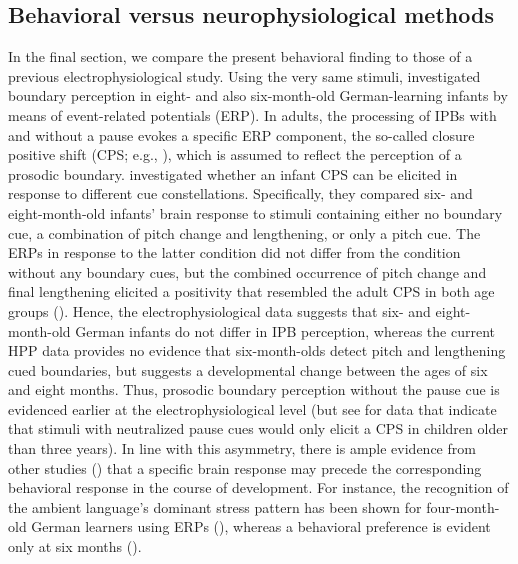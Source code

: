 \documentclass[output=paper]{langscibook}
\begin{document}
\subsection{Behavioral versus neurophysiological methods}
In the final section, we compare the present behavioral finding to those of a previous electrophysiological study. Using the very same stimuli, \citet{Holzgrefe-Lang2018} investigated boundary perception in eight- and also six-month-old German-learning infants by means of event-related potentials (ERP). In adults, the processing of IPBs with and without a pause evokes a specific ERP component, the so-called closure positive shift (CPS; e.g., \citealt{Holzgrefe-Lang2016, Steinhauer1999}), which is assumed to reflect the perception of a prosodic boundary. \citet{Holzgrefe-Lang2018} investigated whether an infant CPS can be elicited in response to different cue constellations. Specifically, they compared six- and eight-month-old infants’ brain response to stimuli containing either no boundary cue, a combination of pitch change and lengthening, or only a pitch cue. The ERPs in response to the latter condition did not differ from the condition without any boundary cues, but the combined occurrence of pitch change and final lengthening elicited a positivity that resembled the adult CPS in both age groups (\citealt{Holzgrefe-Lang2016}). Hence, the electrophysiological data suggests that six- and eight-month-old German infants do not differ in IPB perception, whereas the current HPP data provides no evidence that six-month-olds detect pitch and lengthening cued boundaries, but suggests a developmental change between the ages of six and eight months. Thus, prosodic boundary perception without the pause cue is evidenced earlier at the electrophysiological level (but see \citealt{Mannel2009, Mannel2013} for data that indicate that stimuli with neutralized pause cues would only elicit a CPS in children older than three years). In line with this asymmetry, there is ample evidence from other studies (\citealt{Friederici2007, Hohle2009, Schipke2012}) that a specific brain response may precede the corresponding behavioral response in the course of development. For instance, the recognition of the ambient language’s dominant stress pattern has been shown for four-month-old German learners using ERPs (\citealt{Friederici2007}), whereas a behavioral preference is evident only at six months (\citealt{Hohle2009}).
\end{document}
